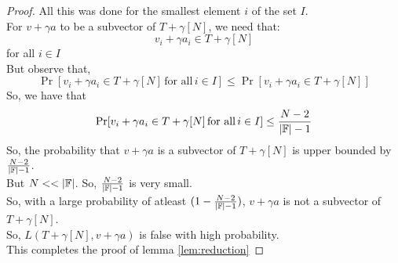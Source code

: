 \begin{proof}
    All this was done for the smallest element $i$ of the set $I$.\\
    For $v+\gamma a$ to be a subvector of $T+\gamma [N]$, we need that:
    $$v_i +\gamma a_i \in T+\gamma[N]$$ for all $i \in I$\\
    But observe that,
    $$\Pr[v_i +\gamma a_i \in T+\gamma[N] \, \text{for all} \, i \in I] \leq \Pr[v_i +\gamma a_i \in T+\gamma[N]] $$
    So, we have that $$\Pr[v_i +\gamma a_i \in T+\gamma[N] \, \text{for all} \,i \in I] \leq \frac{N-2}{|\mathbb{F}|-1}$$
    So, the probability that $v+\gamma a$ is a subvector of $T+\gamma [N]$ is upper bounded by $\frac{N-2}{|\mathbb{F}|-1}$. \\
    But $N <<|\F|$. So, $\frac{N-2}{|\mathbb{F}|-1}$ is very small. \\
    So, with a large probability of atleast $(1-\frac{N-2}{|\mathbb{F}|-1})$, $v+\gamma a$ is not a subvector of $T+\gamma [N]$. \\
    So, $L(T+\gamma[N], v+\gamma a)$ is false with high probability. \\
    This completes the proof of lemma \ref{lem:reduction}
\end{proof}
